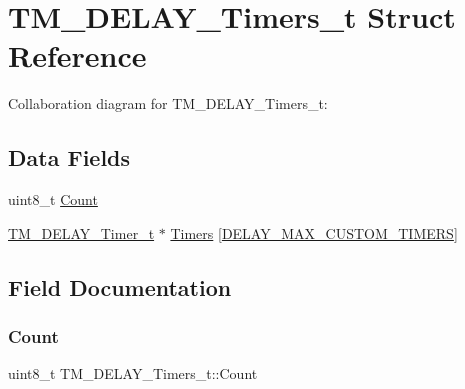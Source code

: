 \hypertarget{struct_t_m___d_e_l_a_y___timers__t}{}\section{T\+M\+\_\+\+D\+E\+L\+A\+Y\+\_\+\+Timers\+\_\+t Struct Reference}
\label{struct_t_m___d_e_l_a_y___timers__t}


Collaboration diagram for T\+M\+\_\+\+D\+E\+L\+A\+Y\+\_\+\+Timers\+\_\+t\+:
\subsection*{Data Fields}
\begin{DoxyCompactItemize}
\item 
uint8\+\_\+t \hyperlink{struct_t_m___d_e_l_a_y___timers__t_a8fcf8463f72924bebb7c1b9180b2a26c}{Count}
\item 
\hyperlink{group___t_m___d_e_l_a_y___typedefs_gaf0beeb077a757f34c8b176464d9a0e85}{T\+M\+\_\+\+D\+E\+L\+A\+Y\+\_\+\+Timer\+\_\+t} $\ast$ \hyperlink{struct_t_m___d_e_l_a_y___timers__t_a2e9d161ecf8630d42fd54373766b451a}{Timers} \mbox{[}\hyperlink{group___t_m___d_e_l_a_y___macros_ga4430f41745879f32d4be22748ba2fbcd}{D\+E\+L\+A\+Y\+\_\+\+M\+A\+X\+\_\+\+C\+U\+S\+T\+O\+M\+\_\+\+T\+I\+M\+E\+RS}\mbox{]}
\end{DoxyCompactItemize}


\subsection{Field Documentation}
\mbox{\label{struct_t_m___d_e_l_a_y___timers__t_a8fcf8463f72924bebb7c1b9180b2a26c}} 
\subsubsection{\texorpdfstring{Count}{Count}}
{\footnotesize\ttfamily uint8\+\_\+t T\+M\+\_\+\+D\+E\+L\+A\+Y\+\_\+\+Timers\+\_\+t\+::\+Count}

\mbox{\label{struct_t_m___d_e_l_a_y___timers__t_a2e9d161ecf8630d42fd54373766b451a}} 
